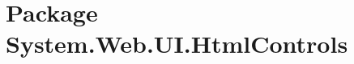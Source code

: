 \section{Package System.Web.UI.Html\-Controls}
\label{namespace_system_1_1_web_1_1_u_i_1_1_html_controls}


